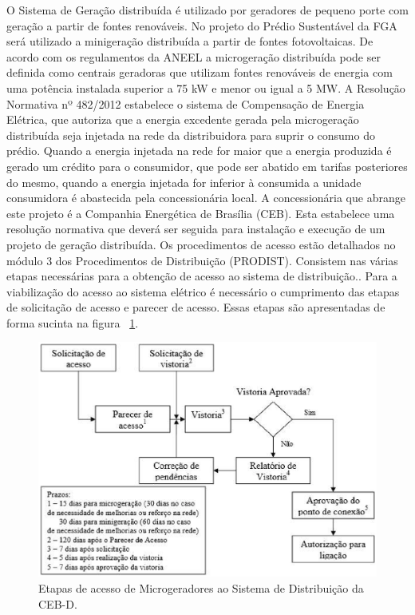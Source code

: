O Sistema de Geração distribuída é utilizado por geradores de pequeno porte com geração a partir de fontes renováveis. No projeto do Prédio Sustentável da FGA será utilizado a minigeração distribuída a partir de fontes fotovoltaicas.
De acordo com os regulamentos da ANEEL a microgeração distribuída pode ser definida como centrais geradoras que utilizam fontes renováveis de energia com uma potência instalada superior a 75 kW e menor ou igual a 5 MW. A Resolução Normativa nº 482/2012 estabelece o sistema de Compensação de Energia Elétrica, que autoriza que a energia excedente gerada pela microgeração distribuída seja injetada na rede da distribuidora para suprir o consumo do prédio. Quando a energia injetada na rede for maior que a energia produzida é gerado um crédito para o consumidor, que pode ser abatido em tarifas posteriores do mesmo, quando a energia injetada for inferior à consumida a unidade consumidora é abastecida pela concessionária local.
A concessionária que abrange este projeto é a Companhia Energética de Brasília (CEB). Esta estabelece uma resolução normativa \cite{ntd609} que deverá ser seguida para instalação e execução de um projeto de geração distribuída.
Os procedimentos de acesso estão detalhados no módulo 3 dos Procedimentos de Distribuição (PRODIST). Consistem nas várias etapas necessárias para a obtenção de acesso ao sistema de distribuição.. Para a viabilização do acesso ao sistema elétrico é necessário o cumprimento das etapas de solicitação de acesso e parecer de acesso. Essas etapas são apresentadas de forma sucinta na figura ~\ref{fig:fluxograma}.

\begin{figure}[!h]
  \centering
  \includegraphics[keepaspectratio=true,scale=0.5]{figuras/fluxograma_smartgrid.eps}
  \caption{Etapas de acesso de Microgeradores ao Sistema de Distribuição da CEB-D.}
  \label{fig:fluxograma}
\end{figure}

